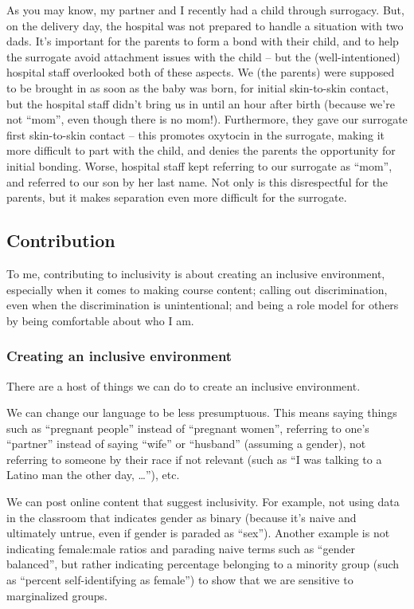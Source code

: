 \documentclass[]{article}
\begin{document}
As you may know, my partner and I recently had a child through surrogacy. But, on the delivery day, the hospital was not prepared to handle a situation with two dads. It's important for the parents to form a bond with their child, and to help the surrogate avoid attachment issues with the child -- but the (well-intentioned) hospital staff overlooked both of these aspects. We (the parents) were supposed to be brought in as soon as the baby was born, for initial skin-to-skin contact, but the hospital staff didn't bring us in until an hour after birth (because we're not ``mom'', even though there is no mom!). Furthermore, they gave our surrogate first skin-to-skin contact -- this promotes oxytocin in the surrogate, making it more difficult to part with the child, and denies the parents the opportunity for initial bonding. Worse, hospital staff kept referring to our surrogate as ``mom'', and referred to our son by her last name. Not only is this disrespectful for the parents, but it makes separation even more difficult for the surrogate.

\hypertarget{contribution}{%
\subsection{Contribution}\label{contribution}}

To me, contributing to inclusivity is about creating an inclusive environment, especially when it comes to making course content; calling out discrimination, even when the discrimination is unintentional; and being a role model for others by being comfortable about who I am.

\hypertarget{creating-an-inclusive-environment}{%
\subsubsection{Creating an inclusive environment}\label{creating-an-inclusive-environment}}

There are a host of things we can do to create an inclusive environment.

We can change our language to be less presumptuous. This means saying things such as ``pregnant people'' instead of ``pregnant women'', referring to one's ``partner'' instead of saying ``wife'' or ``husband'' (assuming a gender), not referring to someone by their race if not relevant (such as ``I was talking to a Latino man the other day, \ldots{}''), etc.

We can post online content that suggest inclusivity. For example, not using data in the classroom that indicates gender as binary (because it's naive and ultimately untrue, even if gender is paraded as ``sex''). Another example is not indicating female:male ratios and parading naive terms such as ``gender balanced'', but rather indicating percentage belonging to a minority group (such as ``percent self-identifying as female'') to show that we are sensitive to marginalized groups.
\end{document}
